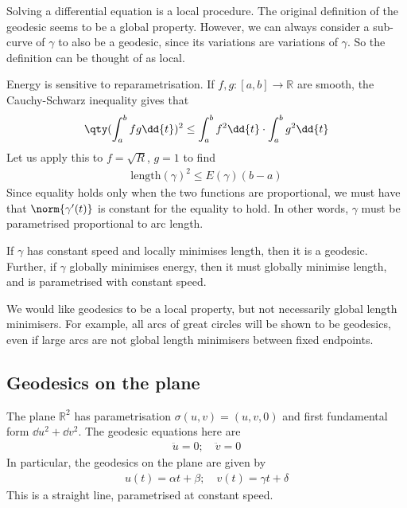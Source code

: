 \begin{remark}
	Solving a differential equation is a local procedure.
	The original definition of the geodesic seems to be a global property.
	However, we can always consider a sub-curve of $\gamma$ to also be a geodesic, since its variations are variations of $\gamma$.
	So the definition can be thought of as local.

	Energy is sensitive to reparametrisation.
	If $f, g \colon [a,b] \to \mathbb R$ are smooth, the Cauchy-Schwarz inequality gives that
	\begin{align*}
		\qty(\int_a^b fg \dd{t})^2 \leq \int_a^b f^2 \dd{t} \cdot \int_a^b g^2 \dd{t}
	\end{align*}
	Let us apply this to $f = \sqrt{R}$, $g = 1$ to find
	\begin{align*}
		\mathrm{length}(\gamma)^2 \leq E(\gamma)(b-a)
	\end{align*}
	Since equality holds only when the two functions are proportional, we must have that $\norm{\gamma'(t)}$ is constant for the equality to hold.
	In other words, $\gamma$ must be parametrised proportional to arc length.
\end{remark}
\begin{corollary}
	If $\gamma$ has constant speed and locally minimises length, then it is a geodesic.
	Further, if $\gamma$ globally minimises energy, then it must globally minimise length, and is parametrised with constant speed.
\end{corollary}
\begin{remark}
	We would like geodesics to be a local property, but not necessarily global length minimisers.
	For example, all arcs of great circles will be shown to be geodesics, even if large arcs are not global length minimisers between fixed endpoints.
\end{remark}

\subsection{Geodesics on the plane}
The plane $\mathbb R^2$ has parametrisation $\sigma(u,v) = (u,v,0)$ and first fundamental form $\dd{u}^2 + \dd{v}^2$.
The geodesic equations here are
\begin{align*}
	\ddot u = 0;\quad \ddot v = 0
\end{align*}
In particular, the geodesics on the plane are given by
\begin{align*}
	u(t) = \alpha t + \beta;\quad v(t) = \gamma t + \delta
\end{align*}
This is a straight line, parametrised at constant speed.

